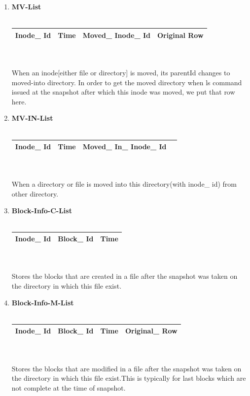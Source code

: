 \begin{enumerate}
\item \textbf{MV-List}\\\\
\begin{tabular}{|c|c|c|c|}
\hline
Inode\_ Id&
Time&
Moved\_ Inode\_ Id&
Original Row\\
\hline
\end{tabular}\\\\
When an inode[either file or directory] is moved, its parentId changes to moved-into directory. In order to get the moved directory when ls command issued at the snapshot after which this inode was moved, we put that row here. 

\item \textbf{MV-IN-List}\\\\
\begin{tabular}{|c|c|c|c|}
\hline
Inode\_ Id&
Time&
Moved\_ In\_ Inode\_ Id\\
\hline
\end{tabular}\\\\
When a directory or file is moved into this directory(with inode\_ id) from other directory.

\item \textbf{Block-Info-C-List}\\\\
\begin{tabular}{|c|c|c|}
\hline
Inode\_ Id&
Block\_ Id&
Time\\
\hline
\end{tabular}\\\\
Stores the blocks that are created in a file after the snapshot was taken on the directory in which this file exist.

\item \textbf{Block-Info-M-List}\\\\
\begin{tabular}{|c|c|c|c|}
\hline
Inode\_ Id&
Block\_ Id&
Time&
Original\_ Row\\
\hline
\end{tabular}\\\\
Stores the blocks that are modified in a file after the snapshot was taken on the directory in which this file exist.This is typically for last blocks which are not complete at the time of snapshot.

\end{enumerate}

